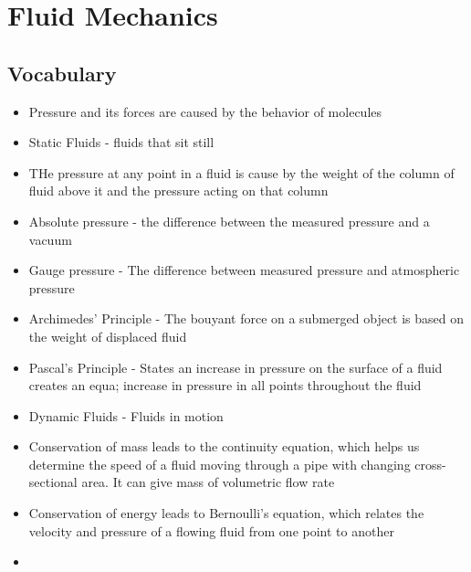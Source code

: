 \section{Fluid Mechanics}

\subsection{Vocabulary}
\begin{itemize}
    \item Pressure and its forces are caused by the behavior of molecules 
    \item Static Fluids - fluids that sit still
    \item THe pressure at any point in a fluid is cause by the weight of the column of fluid above it and the pressure acting on that column
    \item Absolute pressure - the difference between the measured pressure and a vacuum
    \item Gauge pressure - The difference between measured pressure and atmospheric pressure
    \item Archimedes' Principle - The bouyant force on a submerged object is based on the weight of displaced fluid
    \item Pascal's Principle - States an increase in pressure on the surface of a fluid creates an equa; increase in pressure in all points throughout the fluid
    \item Dynamic Fluids - Fluids in motion 
    \item Conservation of mass leads to the continuity equation, which helps us determine the speed of a fluid moving through a pipe with changing cross-sectional area. It can give mass of volumetric flow rate
    \item Conservation of energy leads to Bernoulli's equation, which relates the velocity and pressure of a flowing fluid from one point to another
    \item 
\end{itemize}

